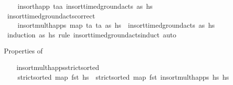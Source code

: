 \begin{isabellebody}
\ \ \ \ insort{\isacharunderscore}{\kern0pt}happ\ {\isacharparenleft}{\kern0pt}t\isactrlsub a{\isacharcomma}{\kern0pt}{\isacharbrackleft}{\kern0pt}a{\isacharbrackright}{\kern0pt}{\isacharparenright}{\kern0pt}\ {\isacharparenleft}{\kern0pt}insort{\isacharunderscore}{\kern0pt}timed{\isacharunderscore}{\kern0pt}ground{\isacharunderscore}{\kern0pt}acts\ as\ hs{\isacharparenright}{\kern0pt}{\isachardoublequoteclose}\isanewline
\isanewline
\ \ \isamarkupfalse%
\ insort{\isacharunderscore}{\kern0pt}timed{\isacharunderscore}{\kern0pt}ground{\isacharunderscore}{\kern0pt}acts{\isacharunderscore}{\kern0pt}correct{\isacharcolon}{\kern0pt}\ \isanewline
\ \ \ \ {\isachardoublequoteopen}insort{\isacharunderscore}{\kern0pt}mult{\isacharunderscore}{\kern0pt}happs\ {\isacharparenleft}{\kern0pt}map\ {\isacharparenleft}{\kern0pt}{\isasymlambda}{\isacharparenleft}{\kern0pt}t{\isacharcomma}{\kern0pt}a{\isacharparenright}{\kern0pt}{\isachardot}{\kern0pt}\ {\isacharparenleft}{\kern0pt}t{\isacharcomma}{\kern0pt}{\isacharbrackleft}{\kern0pt}a{\isacharbrackright}{\kern0pt}{\isacharparenright}{\kern0pt}{\isacharparenright}{\kern0pt}\ as{\isacharparenright}{\kern0pt}\ hs\ {\isacharequal}{\kern0pt}\ insort{\isacharunderscore}{\kern0pt}timed{\isacharunderscore}{\kern0pt}ground{\isacharunderscore}{\kern0pt}acts\ as\ hs{\isachardoublequoteclose}\isanewline
%
\isadelimproof
\ \ \ \ %
\endisadelimproof
%
\isatagproof
{}\isamarkupfalse%
\ {\isacharparenleft}{\kern0pt}induction\ as\ hs\ rule{\isacharcolon}{\kern0pt}\ insort{\isacharunderscore}{\kern0pt}timed{\isacharunderscore}{\kern0pt}ground{\isacharunderscore}{\kern0pt}acts{\isachardot}{\kern0pt}induct{\isacharparenright}{\kern0pt}\ auto%
\endisatagproof
{\isafoldproof}%
%
\isadelimproof
%
\endisadelimproof
%
\begin{isamarkuptext}%
Properties of %
\end{isamarkuptext}\isamarkuptrue%
\ \ \isamarkupfalse%
\ insort{\isacharunderscore}{\kern0pt}mult{\isacharunderscore}{\kern0pt}happs{\isacharunderscore}{\kern0pt}strict{\isacharunderscore}{\kern0pt}sorted{\isacharcolon}{\kern0pt}\ \isanewline
\ \ \ \ {\isachardoublequoteopen}strict{\isacharunderscore}{\kern0pt}sorted\ {\isacharparenleft}{\kern0pt}map\ fst\ hs\ {\isasymLongrightarrow}\ strict{\isacharunderscore}{\kern0pt}sorted\ {\isacharparenleft}{\kern0pt}map\ fst\ {\isacharparenleft}{\kern0pt}insort{\isacharunderscore}{\kern0pt}mult{\isacharunderscore}{\kern0pt}happs\ hs\ hs\isanewline

\end{isabellebody}
